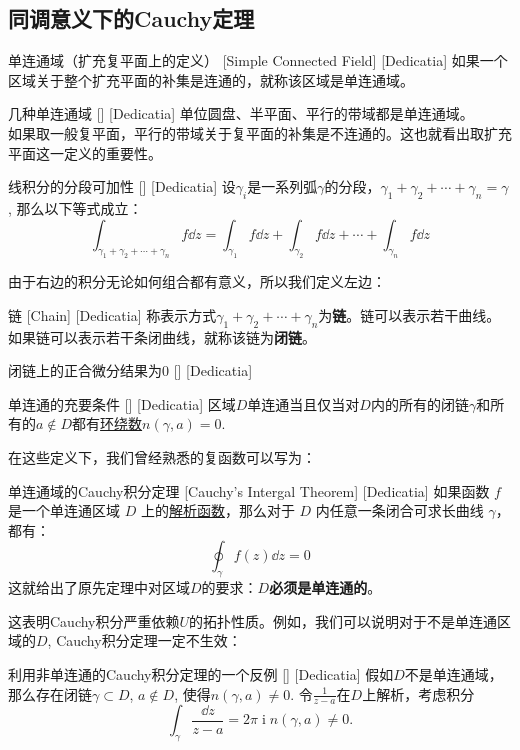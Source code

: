 \documentclass[UTF8]{ctexart}
\DeclareMathOperator{\ii}{\mathrm{i}}
\newcommand{\AnalyticalFunction}{\hyperref[dfn:AnalyticalFunction]{解析函数}}
\begin{document}
\subsection{同调意义下的Cauchy定理}
\begin{dfn}
    [UUID]
    {单连通域（扩充复平面上的定义）}
    [Simple Connected Field]
    [Dedicatia]
    如果一个区域关于整个扩充平面的补集是连通的，就称该区域是单连通域。
\end{dfn}
\begin{xmp}
    [UUID]
    {几种单连通域}
    []
    [Dedicatia]
    单位圆盘、半平面、平行的带域都是单连通域。\\
    如果取一般复平面，平行的带域关于复平面的补集是不连通的。这也就看出取扩充平面这一定义的重要性。
\end{xmp}
\begin{ppt}
    [UUID]
    {线积分的分段可加性}
    []
    [Dedicatia]
    设$\gamma_i$是一系列弧$\gamma$的分段，$\gamma_1+\gamma_2+\cdots+\gamma_n=\gamma$, 那么以下等式成立：
    \[\int_{\gamma_1+\gamma_2+\cdots+\gamma_n}f\dd{z}=\int_{\gamma_1}f\dd{z}+\int_{\gamma_2}f\dd{z}+\cdots+\int_{\gamma_n}f\dd{z}\]
\end{ppt}
由于右边的积分无论如何组合都有意义，所以我们定义左边：
\begin{dfn}
    [UUID]
    {链}
    [Chain]
    [Dedicatia]
    称表示方式$\gamma_1+\gamma_2+\cdots+\gamma_n$为\textbf{链}。链可以表示若干曲线。如果链可以表示若干条闭曲线，就称该链为\textbf{闭链}。
\end{dfn}
\begin{ppt}
    [UUID]
    {闭链上的正合微分结果为0}
    []
    [Dedicatia]
\end{ppt}
\begin{thm}
    [UUID]
    {单连通的充要条件}
    []
    [Dedicatia]
    区域$D$单连通当且仅当对$D$内的所有的闭链$\gamma$和所有的$a\notin D$都有\hyperref[dfn:WindingNumber]{环绕数}$n(\gamma,a)=0$.
\end{thm}
在这些定义下，我们曾经熟悉的复函数可以写为：
\begin{thm}
    [UUID]
    {单连通域的Cauchy积分定理}
    [Cauchy's Intergal Theorem]
    [Dedicatia]
    如果函数 \( f \) 是一个单连通区域 \( D \) 上的\AnalyticalFunction，那么对于 \( D \) 内任意一条闭合可求长曲线 \( \gamma \)，都有：
    \[\oint_{\gamma} f(z) \dd z = 0\]
    这就给出了原先定理中对区域$D$的要求：\textbf{$D$必须是单连通的}。
\end{thm}
这表明Cauchy积分严重依赖$U$的拓扑性质。例如，我们可以说明对于不是单连通区域的$D$, Cauchy积分定理一定不生效：
\begin{cxmp}
    [UUID]
    {利用非单连通的Cauchy积分定理的一个反例}
    []
    [Dedicatia]
    假如$D$不是单连通域，那么存在闭链$\gamma\subset D$, $a\notin D$, 使得$n(\gamma,a)\neq 0$. 令$\frac{1}{z-a}$在$D$上解析，考虑积分
    \[\int_\gamma\frac{\dd{z}}{z-a}=2\pi\ii n(\gamma,a)\neq 0.\]
\end{cxmp}
\end{document}
